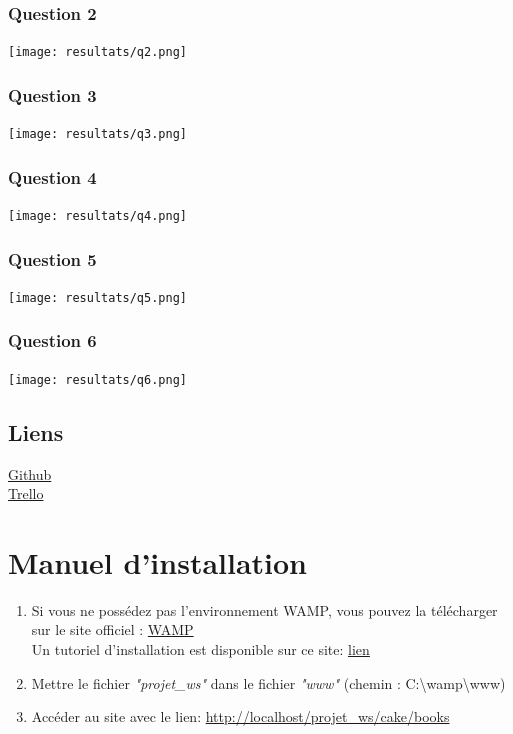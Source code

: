 \documentclass{report}
\begin{document}
		\subsection{Question 2}
		\begin{center}
			\texttt{[image: resultats/q2.png]} 
		\end{center} 
		\subsection{Question 3}
		\begin{center}
			\texttt{[image: resultats/q3.png]} 
		\end{center} 
		\subsection{Question 4}
		\begin{center}
			\texttt{[image: resultats/q4.png]} 
		\end{center} 
		\subsection{Question 5}
		\begin{center}
			\texttt{[image: resultats/q5.png]} 
		\end{center} 
		\subsection{Question 6}
		\begin{center}
			\texttt{[image: resultats/q6.png]} 
		\end{center} 
		
	\section{Liens}
		\href{https://github.com/kvasseur/webservices}{Github} \\
		\href{https://trello.com/b/A1vuuQZb/webservices-api-rest-mediatheque}{Trello}
	
	
	\chapter{Manuel d'installation}
	
	\begin{enumerate}
		\item Si vous ne poss\'{e}dez pas l'environnement WAMP, vous pouvez la t\'{e}l\'{e}charger sur le site officiel : \href{http://www.wampserver.com/}{WAMP}\\
		Un tutoriel d'installation est disponible sur ce site: \href{http://www.cndp.fr/crdp-dijon/Installer-et-configurer-Wampserver.html}{lien}
		\item Mettre le fichier \textit{"projet\_ws"} dans le fichier \textit{"www"} (chemin : C:\textbackslash wamp\textbackslash www)
		\item Acc\'{e}der au site avec le lien: \url{http://localhost/projet_ws/cake/books}
	\end{enumerate}
	
\end{document}
